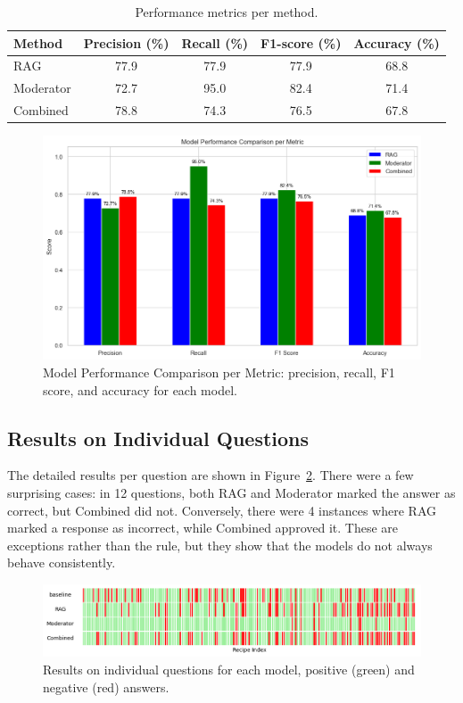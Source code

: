 \begin{table}[ht]
\centering
\caption{Performance metrics per method.}
\label{tab:metrics}
\begin{tabular}{lcccc}
\toprule
Method & Precision (\%) & Recall (\%) & F1-score (\%) & Accuracy (\%) \\
\midrule
RAG        & 77.9 & 77.9 & 77.9 & 68.8 \\
Moderator  & 72.7 & 95.0 & 82.4 & 71.4 \\
Combined   & 78.8 & 74.3 & 76.5 & 67.8 \\
\bottomrule
\end{tabular}
\end{table}

\begin{figure}[ht]
  \centering
  \includegraphics[width=0.95\linewidth]{figures/model_performance comparison_per_metric.png}
  \caption{Model Performance Comparison per Metric: precision, recall, F1 score, and accuracy for each model.}
  \label{fig:model_performance_comparison_per_metric}
\end{figure}

\subsection{Results on Individual Questions}

The detailed results per question are shown in Figure~\ref{fig:dna-results}. There were a few surprising cases: in 12 questions, both RAG and Moderator marked the answer as correct, but Combined did not. Conversely, there were 4 instances where RAG marked a response as incorrect, while Combined approved it. These are exceptions rather than the rule, but they show that the models do not always behave consistently.

\begin{figure}[ht]
    \centering
    \includegraphics[width=1\linewidth]{figures/dna-results.png}
    \caption{Results on individual questions for each model, positive (green) and negative (red) answers.}
    \label{fig:dna-results}
\end{figure}

